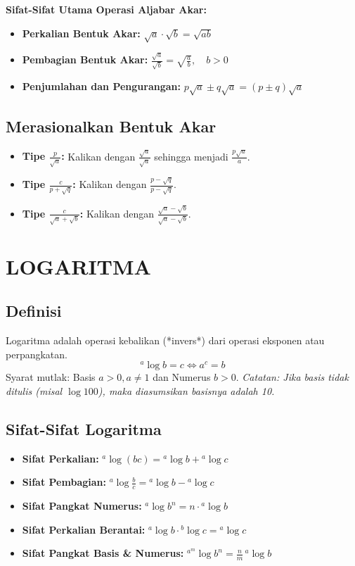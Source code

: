 \documentclass[12pt, a4paper]{article}
\begin{document}
\noindent \textbf{Sifat-Sifat Utama Operasi Aljabar Akar:} 
\begin{itemize}
    \item \textbf{Perkalian Bentuk Akar:} $\sqrt{a} \cdot \sqrt{b} = \sqrt{ab}$
    \item \textbf{Pembagian Bentuk Akar:} $\frac{\sqrt{a}}{\sqrt{b}} = \sqrt{\frac{a}{b}}, \quad b > 0$
    \item \textbf{Penjumlahan dan Pengurangan:} $p\sqrt{a} \pm q\sqrt{a} = (p \pm q)\sqrt{a}$
\end{itemize}

\subsection{Merasionalkan Bentuk Akar}
\begin{itemize}
    \item \textbf{Tipe $\frac{p}{\sqrt{a}}$:} Kalikan dengan $\frac{\sqrt{a}}{\sqrt{a}}$ sehingga menjadi $\frac{p\sqrt{a}}{a}$.
    \item \textbf{Tipe $\frac{c}{p + \sqrt{q}}$:} Kalikan dengan $\frac{p - \sqrt{q}}{p - \sqrt{q}}$.
    \item \textbf{Tipe $\frac{c}{\sqrt{a} + \sqrt{b}}$:} Kalikan dengan $\frac{\sqrt{a} - \sqrt{b}}{\sqrt{a} - \sqrt{b}}$.
\end{itemize}

\section{LOGARITMA}

\subsection{Definisi}
Logaritma adalah operasi kebalikan (*invers*) dari operasi eksponen atau perpangkatan.
\[ {}^a\!\log b = c \iff a^c = b \] 
\noindent Syarat mutlak: Basis $a > 0, a \neq 1$ dan Numerus $b > 0$. \textit{Catatan: Jika basis tidak ditulis (misal $\log 100$), maka diasumsikan basisnya adalah 10.}

\subsection{Sifat-Sifat Logaritma}
\begin{itemize}
    \item \textbf{Sifat Perkalian:} ${}^a\!\log (bc) = {}^a\!\log b + {}^a\!\log c$
    \item \textbf{Sifat Pembagian:} ${}^a\!\log \frac{b}{c} = {}^a\!\log b - {}^a\!\log c$
    \item \textbf{Sifat Pangkat Numerus:} ${}^a\!\log b^n = n \cdot {}^a\!\log b$
    \item \textbf{Sifat Perkalian Berantai:} ${}^a\!\log b \cdot {}^b\!\log c = {}^a\!\log c$
    \item \textbf{Sifat Pangkat Basis \& Numerus:} ${}^{a^m}\!\log b^n = \frac{n}{m}\,{}^a\!\log b$
\end{itemize}
\end{document}
